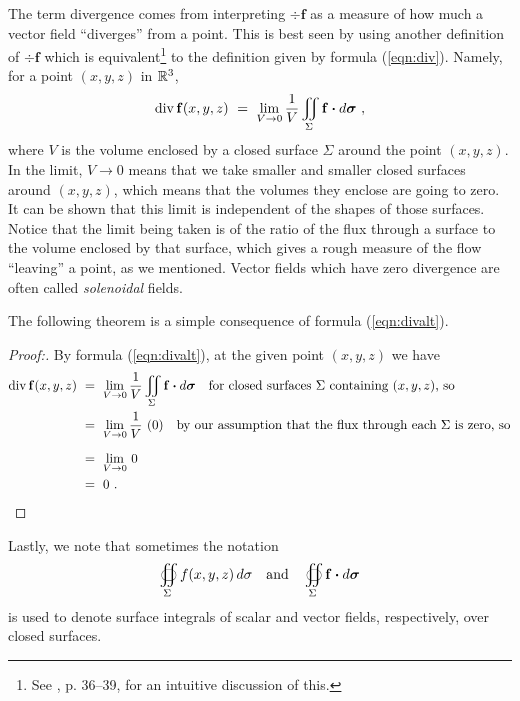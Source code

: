 The term divergence comes from interpreting $\div\mathbf{f}$ as a measure of how much a vector field ``diverges''
from a point. 
This is best seen by using another definition of $\div\mathbf{f}$ which is
equivalent\footnote{See \cite{sch}, p. 36--39, for an intuitive discussion of this.} to the definition given by
formula (\ref{eqn:div}). 
Namely, for a point $(x,y,z)$ in $\mathbb{R}^{3}$,
\begin{equation}\label{eqn:divalt}
 \mathop{\mathrm{div}}\nolimits\mathbf{f}(x,y,z) ~=~ \lim_{V \to 0} \frac{1}{V} \iint\limits_{\Sigma} \mathbf{f} \bm{\cdot} d\bm{\sigma} ~,
\end{equation}
where $V$ is the volume enclosed by a closed surface $\Sigma$ around the point $(x,y,z)$. In the limit, $V \to 0$ means
that we take smaller and smaller closed surfaces around $(x,y,z)$, which means that the volumes they enclose are going
to zero. It can be shown that this limit is independent of the shapes of those surfaces. Notice that the limit being
taken is of the ratio of the flux through a surface to the volume enclosed by that surface, which gives a rough
measure of the flow ``leaving'' a point, as we mentioned. Vector fields which have zero divergence are
often called \emph{solenoidal} fields.

The following theorem is a simple consequence of formula (\ref{eqn:divalt}).

\begin{proofbar}\begin{proof}[Proof:]
 By formula (\ref{eqn:divalt}), at the given point $(x,y,z)$ we have 
 \begin{align*}
  \div\mathbf{f}(x,y,z) ~&=~ \lim_{V \to 0} \frac{1}{V} \iint\limits_{\Sigma} \Dotprod{\mathbf{f}}{d\bm{\sigma}}
   ~~~\text{for closed surfaces $\Sigma$ containing $(x,y,z)$, so}\\
    &=~ \lim_{V \to 0} \frac{1}{V} \,\, (0) ~~~\text{by our assumption that the flux through each $\Sigma$ is
    zero, so}\\[6pt]
    &=~ \lim_{V \to 0} \, 0\\
    &=~ 0 ~.\hfill\qedhere
 \end{align*}
\end{proof}\end{proofbar}

Lastly, we note that sometimes the notation
\begin{displaymath}
 \oiint\limits_{\Sigma} f(x,y,z)\,d\sigma \quad\text{and}\quad \oiint\limits_{\Sigma} \mathbf{f} \bm{\cdot} d\bm{\sigma}
\end{displaymath}
is used to denote surface integrals of scalar and vector fields, respectively, over closed
surfaces.\index{$\oiint\limits_{\Sigma}$}

